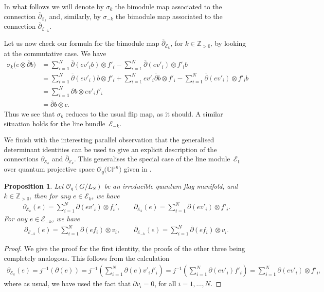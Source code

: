 \documentclass[10pt,a4paper]{amsart}
\numberwithin{equation}{section}
\newtheorem{prop}[Theorem]{Proposition}
 { \theoremstyle{definition}
\newtheorem{defn}[Theorem]{Definition}
\newtheorem{Note}[Theorem]{Note}
\newtheorem{eg}[Theorem]{Example}
\newtheorem{Remark}[Theorem]{Remark} }
\newcommand\del{\partial}
\newcommand\adel{\overline{\partial}}
\begin{document}
In what follows we will denote by $\sigma_k$ the bimodule map associated to the connection $\overline{\partial}_{\mathcal{E}_k}$ and, similarly, by $\sigma_{-k}$ the bimodule map associated to the connection $\adel_{\mathcal{E}_{-k}}$.

\begin{eg}
Let us now check our formula for the bimodule map $\adel_{\mathcal{E}_k}$, for $k \in \mathbb{Z}_{>0}$, by looking at the commutative case. We have
\begin{align*}
\sigma_k\big(e \otimes \adel b\big) &= \sum_{i=1}^{N} \adel(ev'_ib) \otimes f'_i - \sum_{i=1}^{N} \adel(ev'_i) \otimes f'_ib \\
&= \sum_{i=1}^{N} \adel(ev'_i)b \otimes f'_i + \sum_{i=1}^{N} ev'_i\adel b \otimes f'_i - \sum_{i=1}^{N} \adel(ev'_i) \otimes f'_ib \\
&= \sum_{i=1}^{N} \adel b \otimes ev'_if'_i \\
&= \adel b \otimes e.
\end{align*}
Thus we see that $\sigma_k$ reduces to the usual flip map, as it should. A similar situation holds for the line bundle~$\mathcal{E}_{-k}$.
\end{eg}

We finish with the interesting parallel observation that the generalised determinant identities can be used to give an explicit description of the connections $\del_{\mathcal{E}_k}$ and $\adel_{\mathcal{E}_k}$. This generalises the special case of the line module~$\mathcal{E}_1$ over quantum projective space $\mathcal{O}_q\big(\mathbb{CP}^{n}\big)$ given in \cite[Example~8.5]{MMF1}.

\begin{prop}Let $\mathcal{O}_q(G/L_S)$ be an irreducible quantum flag manifold, and $k \in \mathbb{Z}_{>0}$, then for any $e \in \mathcal{E}_k$, we have
\begin{gather*}%
\del_{\mathcal{E}_k}(e) = \sum_{i=1}^N \del(ev'_i) \otimes f_i', \qquad \adel_{\mathcal{E}_{k}}(e) = \sum_{i=1}^N \adel(ev'_i) \otimes f'_i.
\end{gather*}
 For any $e \in \mathcal{E}_{-k}$, we have
\begin{gather}\label{eqn:exadelbar}
\del_{\mathcal{E}_{-k}}(e) = \sum_{i=1}^N \del(ef_i) \otimes v_i, \qquad \adel_{\mathcal{E}_{-k}}(e) = \sum_{i=1}^N \adel(ef_i) \otimes v_i.
\end{gather}
\end{prop}
\begin{proof}We give the proof for the first identity, the proofs of the other three being completely analogous. This follows from the calculation
\begin{gather*}
\del_{\mathcal{E}_k}(e) = j^{-1}(\del(e)) = j^{-1}\left(\sum_{i=1}^N \del(e)v'_if'_i\right) = j^{-1}\left(\sum_{i=1}^N \del(ev'_i)f'_i\right) = \sum_{i=1}^N \del(ev'_i) \otimes f'_i,
\end{gather*}
where as usual, we have used the fact that $\del v_i = 0$, for all $i=1, \dots, N$.
\end{proof}
\end{document}
